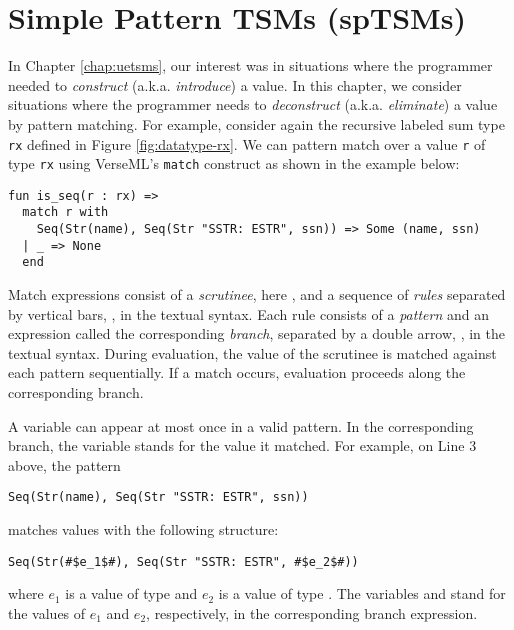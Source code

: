 \chapter{Simple Pattern TSMs (spTSMs)}\label{chap:uptsms}
In Chapter \ref{chap:uetsms}, our interest was in situations where the programmer needed to \emph{construct} (a.k.a. \emph{introduce}) a value. In this chapter, we consider situations where the programmer needs to \emph{deconstruct} (a.k.a. \emph{eliminate}) a value by pattern matching. For example, consider again the recursive labeled sum type \lstinline{rx} defined in Figure \ref{fig:datatype-rx}. We can pattern match over a value \lstinline{r} of type \lstinline{rx} using VerseML's \lstinline{match} construct as shown in the example below: 
\begin{lstlisting}
fun is_seq(r : rx) => 
  match r with 
    Seq(Str(name), Seq(Str "SSTR: ESTR", ssn)) => Some (name, ssn)
  | _ => None
  end
\end{lstlisting}

Match expressions consist of a \emph{scrutinee}, here , and a sequence of \emph{rules} separated by vertical bars, \li{|}, in the textual syntax. Each rule consists of a \emph{pattern} and an {expression} called the corresponding \emph{branch}, separated by a double arrow, \li{=>}, in the textual syntax. During evaluation, the value of the scrutinee is matched against each pattern sequentially. If a match occurs, evaluation proceeds along the corresponding branch. 

A variable can  appear at most once in a valid pattern. In the corresponding branch, the variable stands for the value it matched.  
For example, on Line 3 above, the pattern 
\begin{lstlisting}[numbers=none]
Seq(Str(name), Seq(Str "SSTR: ESTR", ssn))
\end{lstlisting}
matches values with the following structure: 
\begin{lstlisting}[numbers=none]
Seq(Str(#$e_1$#), Seq(Str "SSTR: ESTR", #$e_2$#))
\end{lstlisting}
where $e_1$ is a value of type  and $e_2$ is a value of type . The variables  and  stand for the values of $e_1$ and $e_2$, respectively, in the corresponding branch expression. 

